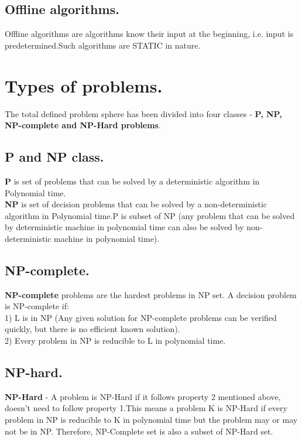 \subsection{Offline algorithms.}Offline algorithms are algorithms know their input at the beginning, i.e. input is predetermined.Such algorithms are STATIC in nature.\\
\section{Types of problems.}The total defined problem sphere has been divided into four classes - \textbf{P, NP, NP-complete and NP-Hard problems}.\\
\subsection{ P and NP class.}\textbf{P} is set of problems that can be solved by a deterministic algorithm in Polynomial time.\\
\textbf{NP} is set of decision problems that can be solved by a non-deterministic algorithm in Polynomial time.P is subset of NP (any problem that can be solved by deterministic machine in polynomial time can also be solved by non-deterministic machine in polynomial time).\\
\subsection{ NP-complete.}\textbf{NP-complete} problems are the hardest problems in NP set. A decision problem is NP-complete if:\\
1) L is in NP (Any given solution for NP-complete problems can be verified quickly, but there is no efficient known solution).\\
2) Every problem in NP is reducible to L in polynomial time.\\
\subsection{NP-hard.}\textbf{NP-Hard }- A problem is NP-Hard if it follows property 2 mentioned above, doesn’t need to follow property 1.This means a problem K is NP-Hard if every problem in NP is reducible to K in polynomial time but the problem may or may not be in NP. Therefore, NP-Complete set is also a subset of NP-Hard set.\\
